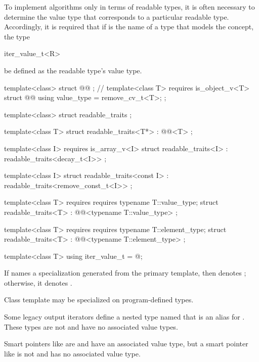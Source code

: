 \begin{addedblock}
\pnum
To implement algorithms only in terms of readable types, it is often necessary
to determine the value type that corresponds to a particular readable type.
Accordingly, it is required that if  is the name of a type that
models the  concept,
the type

\begin{codeblock}
iter_value_t<R>
\end{codeblock}

be defined as the readable type's value type.

%
%
\begin{codeblock}
  template<class> struct @@ { }; // \expos
  template<class T>
    requires is_object_v<T>
  struct @@ {
    using value_type = remove_cv_t<T>;
  };

  template<class> struct readable_traits { };

  template<class T>
  struct readable_traits<T*>
    : @@<T> { };

  template<class I>
    requires is_array_v<I>
  struct readable_traits<I>
    : readable_traits<decay_t<I>> { };

  template<class I>
  struct readable_traits<const I>
    : readable_traits<remove_const_t<I>> { };

  template<class T>
    requires requires { typename T::value_type; }
  struct readable_traits<T>
    : @@<typename T::value_type> { };

  template<class T>
    requires requires { typename T::element_type; }
  struct readable_traits<T>
    : @@<typename T::element_type> { };

  template<class T> using iter_value_t = @\seebelownc@;
\end{codeblock}

\pnum
If  names a specialization
generated from the primary template,
then  denotes ;
otherwise, it denotes .

\pnum
Class template  may be specialized
on program-defined types.

\pnum
\begin{note}
Some legacy output iterators define a nested type named 
that is an alias for . These types are not 
and have no associated value types.
\end{note}

\pnum
\begin{note}
Smart pointers like  are  and
have an associated value type, but a smart pointer like 
is not  and has no associated value type.
\end{note}
\end{addedblock}

